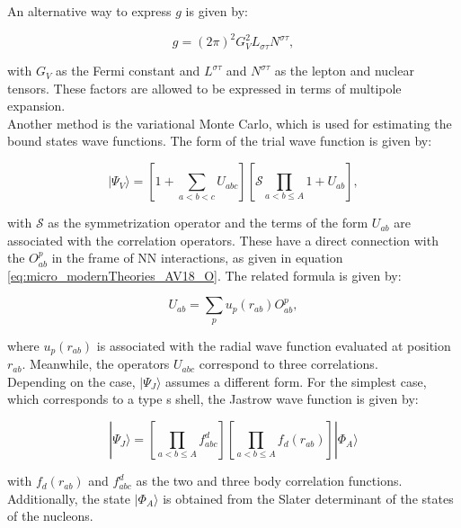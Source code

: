 \documentclass[openany]{book}
\begin{document}
An alternative way to express $g$ is given by:

\begin{equation}\label{eq:micro_modernTheories_weak_crossSection_g_alternative}
	g = (2\pi)^2 G^{2}_V L_{\sigma \tau} N^{\sigma \tau},
\end{equation}

with $G_V$ as the Fermi constant and $L^{\sigma \tau}$ and $N^{\sigma \tau}$ as the lepton and nuclear tensors. These factors are allowed to be expressed in terms of multipole expansion. \\

Another method is the variational Monte Carlo, which is used for estimating the bound states wave functions. The form of the trial wave function is given by:

\begin{equation}\label{eq:micro_modernTheories_variationalMonteCarlo}
	| \Psi_V \rangle = \left[ 1 + \sum_{a < b < c} U_{abc}\right]  \left[ \mathcal{S}  \prod_{a < b \le A } {1 + U_{ab}}\right],
\end{equation}

with $\mathcal{S}$ as the symmetrization operator and the terms of the form $U_{ab}$ are associated with the correlation operators. These have a direct connection with the $O^{p}_{ab}$ in the frame of NN interactions, as given in equation \ref{eq:micro_modernTheories_AV18_O}. The related formula is given by:

\begin{equation}\label{eq:micro_modernTheories_variationalMonteCarlo_correlation}
	U_{ab} = \sum_{p} u_{p}(r_{ab}) O^{p}_{ab},
\end{equation}

where $u_{p}(r_{ab})$ is associated with the radial wave function evaluated at position $r_{ab}$. Meanwhile, the operators $U_{abc}$ correspond to three correlations.  \\

Depending on the case, $|\Psi_J \rangle$ assumes a different form. For the simplest case, which corresponds to a type s shell, the Jastrow wave function is given by:


\begin{equation}\label{eq:micro_modernTheories_variationalMonteCarlo_Jastrow}
	| \Psi_J \rangle  = \left[ \prod_{a < b \le A }{f^{d}_{abc}} \right] \left[ \prod_{a < b \le A }{f_d(r_{ab})} \right] |\Phi_A \rangle
\end{equation}

with $f_d(r_{ab})$ and $f^{d}_{abc}$ as the two and three body correlation functions. Additionally, the state $|\Phi_A \rangle$ is obtained from the Slater determinant of the states of the nucleons.  \\
\end{document}
